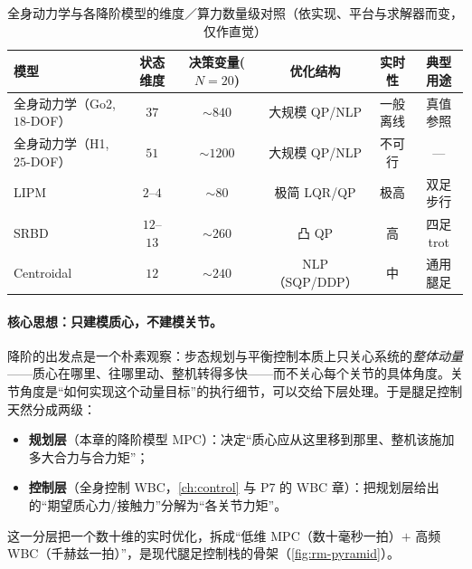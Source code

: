 \begin{table}[H]\centering\small
\caption{全身动力学与各降阶模型的维度／算力数量级对照（依实现、平台与求解器而变，仅作直觉）}
\label{tab:rm-dim}
\begin{tabular}{lccccc}
\toprule
模型 & 状态维度 & 决策变量($N{=}20$) & 优化结构 & 实时性 & 典型用途 \\
\midrule
全身动力学（Go2, $18$-DOF） & $37$ & $\sim\!840$ & 大规模 QP/NLP & 一般离线 & 真值参照 \\
全身动力学（H1, $25$-DOF） & $51$ & $\sim\!1200$ & 大规模 QP/NLP & 不可行 & — \\
LIPM & $2$–$4$ & $\sim\!80$ & 极简 LQR/QP & 极高 & 双足步行 \\
SRBD & $12$–$13$ & $\sim\!260$ & 凸 QP & 高 & 四足 trot \\
Centroidal & $12$ & $\sim\!240$ & NLP（SQP/DDP） & 中 & 通用腿足 \\
\bottomrule
\end{tabular}
\end{table}

\paragraph{核心思想：只建模质心，不建模关节。}
降阶的出发点是一个朴素观察：步态规划与平衡控制本质上只关心系统的\emph{整体动量}——质心在哪里、往哪里动、整机转得多快——而不关心每个关节的具体角度。关节角度是“如何实现这个动量目标”的执行细节，可以交给下层处理。于是腿足控制天然分成两级：
\begin{itemize}
  \item \textbf{规划层}（本章的降阶模型 MPC）：决定“质心应从这里移到那里、整机该施加多大合力与合力矩”；
  \item \textbf{控制层}（全身控制 WBC，\cref{ch:control} 与 P7 的 WBC 章）：把规划层给出的“期望质心力/接触力”分解为“各关节力矩”。
\end{itemize}
这一分层把一个数十维的实时优化，拆成“低维 MPC（数十毫秒一拍）$+$ 高频 WBC（千赫兹一拍）”，是现代腿足控制栈的骨架（\cref{fig:rm-pyramid}）。

